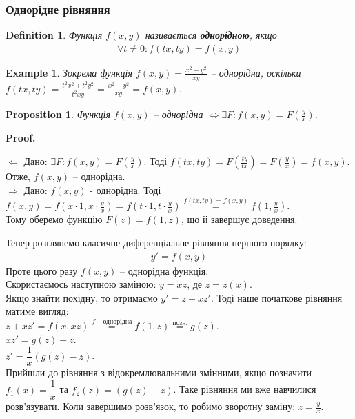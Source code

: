 \documentclass[a4paper, 10pt]{article}
\makeatletter
\def\qed{$\blacksquare$}
\def\rightproof{$\boxed{\Rightarrow}$ }
\def\leftproof{$\boxed{\Leftarrow}$ }
\theoremstyle{theoremdd}
\theoremstyle{theoremdd}
\newtheorem{definition}[theorem]{Definition}
\theoremstyle{theoremdd}
\theoremstyle{theoremdd}
\newtheorem{example}[theorem]{Example}
\theoremstyle{theoremdd}
\newtheorem{proposition}[theorem]{Proposition}
\theoremstyle{theoremdd}
\theoremstyle{theoremdd}
\theoremstyle{theoremdd}
\renewenvironment{proof}[1][Proof.\\]{\par
\pushQED{\hfill \qed}%
\normalfont \topsep6\p@\@plus6\p@\relax
\trivlist
\item\relax
{\bfseries
#1\@addpunct{.}}\hspace\labelsep\ignorespaces
}{%
\popQED\endtrivlist\@endpefalse
}
\makeatother
\begin{document}
	\subsubsection{Однорідне рівняння}
	\begin{definition}
 Функція $f(x,y)$ називається \textbf{однорідною}, якщо
	\begin{align*}
	\forall t \neq 0: f(tx, ty)=f(x,y)
	\end{align*}
	\end{definition}
	
	\begin{example}
	Зокрема функція $\displaystyle f(x,y) = \frac{x^2+y^2}{xy}$ -- однорідна, оскільки \\ $\displaystyle f(tx, ty) = \frac{t^2x^2+t^2y^2}{t^2xy} = \frac{x^2+y^2}{xy} = f(x,y)$.
	\end{example}
	
	\begin{proposition}
 Функція $f(x,y)$ -- однорідна $\iff \displaystyle \exists F: f(x,y)=F\left(\frac{y}{x}\right)$.
	\end{proposition}

	\begin{proof}
	\leftproof Дано: $\displaystyle \exists F: f(x,y)=F\left(\frac{y}{x}\right)$. Тоді $\displaystyle f(tx,ty) = F\left(\frac{ty}{tx} \right) = F\left(\frac{y}{x} \right) = f(x,y)$. \\
	Отже, $f(x,y)$ -- однорідна.
	\bigskip \\
	\rightproof Дано: $f(x,y)$ - однорідна. Тоді $\displaystyle f(x,y) = f\left(x\cdot1, x \cdot \frac{y}{x} \right) = f\left(t\cdot1, t \cdot \frac{y}{x} \right) \overset{f(tx,ty)=f(x,y)}{=} f\left(1, \frac{y}{x}\right)$.\\
	Тому оберемо функцію $F(z) = f(1,z)$, що й завершує доведення.
	\end{proof}
	
	Тепер розглянемо класичне диференціальне рівняння першого порядку:
	\begin{align*}
	y'=f(x,y)
	\end{align*}
	Проте цього разу $f(x,y)$ -- однорідна функція. \\
	Скористаємось наступною заміною: $y = xz$, де $z = z(x)$.\\
	Якщо знайти похідну, то отримаємо $y' = z + xz'$. Тоді наше початкове рівняння матиме вигляд:\\
	$\displaystyle z+xz'=f(x, xz) \overset{f \text{ -- однорідна}}{=} f(1,z) \overset{\textrm{позн.}}{=}g(z)$.\\
	$xz'=g(z)-z$.\\
	$z' = \dfrac{1}{x} (g(z) - z)$.\\
	Прийшли до рівняння з відокремлювальними змінними, якщо позначити $f_1(x) = \dfrac{1}{x}$ та $f_2(z) = (g(z) - z)$. Таке рівняння ми вже навчилися розв'язувати. Коли завершимо розв'язок, то робимо зворотну заміну: $\displaystyle z = \frac{y}{x}$.
	
\end{document}
